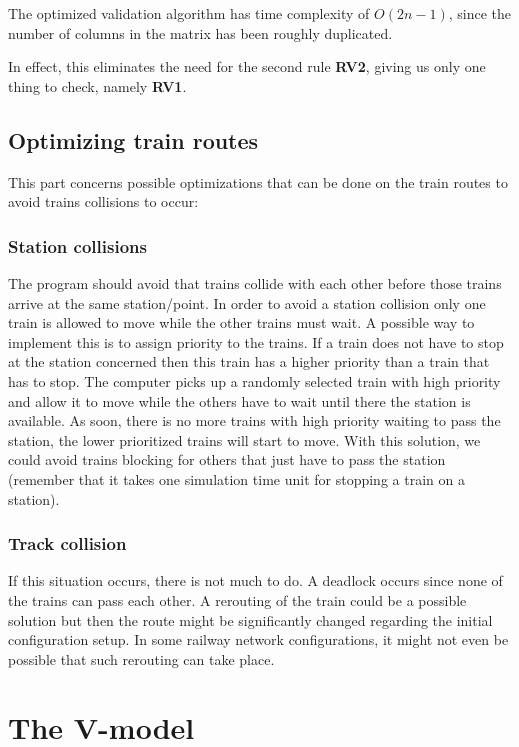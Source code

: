 \documentclass[10pt,a4paper]{article}
\begin{document}
The optimized validation algorithm has time complexity of $O(2n-1)$, since the number of columns in the matrix has been roughly duplicated.

In effect, this eliminates the need for the second rule \textbf{RV2}, giving us only one thing to check, namely \textbf{RV1}.

\subsection{Optimizing train routes}
 
This part concerns possible optimizations that can be done on the train routes to avoid trains collisions to occur:
 
\subsubsection{Station collisions}
 
The program should avoid that trains collide with each other before those trains arrive at the same station/point. In order to avoid a station collision only one train is allowed to move while the other trains must wait. A possible way to implement this is to assign priority to the trains. If a train does not have to stop at the station concerned then this train has a higher priority than a train that has to stop. The computer picks up a randomly selected train with high priority and allow it to move while the others have to wait until there the station is available. As soon, there is no more trains with high priority waiting to pass the station, the lower prioritized trains will start to move.
With this solution, we could avoid trains blocking for others that just have to pass the station (remember that it takes one simulation time unit for stopping a train on a station).
 
\subsubsection{Track collision}
 
If this situation occurs, there is not much to do. A deadlock occurs since none of the trains can pass each other.
A rerouting of the train could be a possible solution but then the route might be significantly changed regarding the initial configuration setup. In some railway network configurations, it might not even be possible that such rerouting can take place.
 

\section{The V-model}
 
\end{document}
